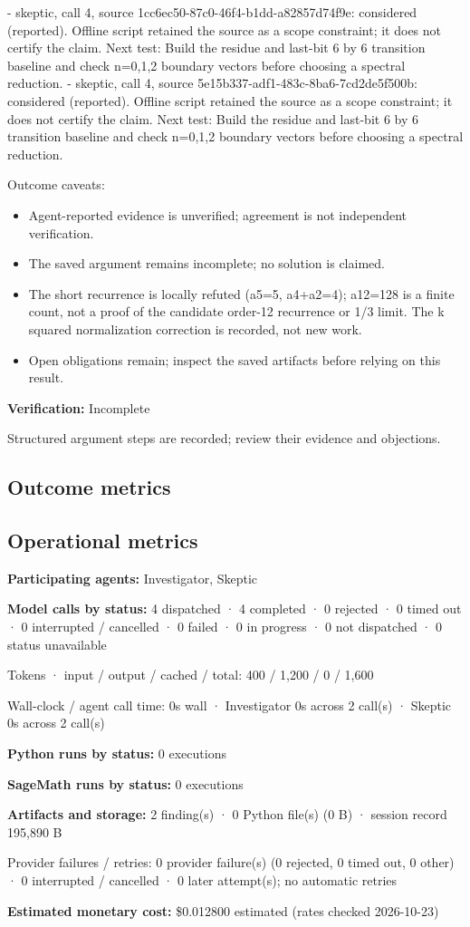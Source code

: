 \documentclass[11pt]{article}
\begin{document}
- skeptic, call 4, source 1cc6ec50-87c0-46f4-b1dd-a82857d74f9e: considered (reported). Offline script retained the source as a scope constraint; it does not certify the claim. Next test: Build the residue and last-bit 6 by 6 transition baseline and check n=0,1,2 boundary vectors before choosing a spectral reduction.
- skeptic, call 4, source 5e15b337-adf1-483c-8ba6-7cd2de5f500b: considered (reported). Offline script retained the source as a scope constraint; it does not certify the claim. Next test: Build the residue and last-bit 6 by 6 transition baseline and check n=0,1,2 boundary vectors before choosing a spectral reduction.\par
Outcome caveats:\par
\begin{itemize}
\item Agent-reported evidence is unverified; agreement is not independent verification.
\item The saved argument remains incomplete; no solution is claimed.
\item The short recurrence is locally refuted (a5=5, a4+a2=4); a12=128 is a finite count, not a proof of the candidate order-12 recurrence or 1/3 limit. The k squared normalization correction is recorded, not new work.
\item Open obligations remain; inspect the saved artifacts before relying on this result.
\end{itemize}
\textbf{Verification:} Incomplete\par
Structured argument steps are recorded; review their evidence and objections.\par
\subsection{Outcome metrics}
\subsection{Operational metrics}
\textbf{Participating agents:} Investigator, Skeptic\par
\textbf{Model calls by status:} 4 dispatched · 4 completed · 0 rejected · 0 timed out · 0 interrupted / cancelled · 0 failed · 0 in progress · 0 not dispatched · 0 status unavailable\par
Tokens · input / output / cached / total: 400 / 1,200 / 0 / 1,600\par
Wall-clock / agent call time: 0s wall · Investigator 0s across 2 call(s) · Skeptic 0s across 2 call(s)\par
\textbf{Python runs by status:} 0 executions\par
\textbf{SageMath runs by status:} 0 executions\par
\textbf{Artifacts and storage:} 2 finding(s) · 0 Python file(s) (0 B) · session record 195,890 B\par
Provider failures / retries: 0 provider failure(s) (0 rejected, 0 timed out, 0 other) · 0 interrupted / cancelled · 0 later attempt(s); no automatic retries\par
\textbf{Estimated monetary cost:} \$0.012800 estimated (rates checked 2026-10-23)\par
\end{document}

